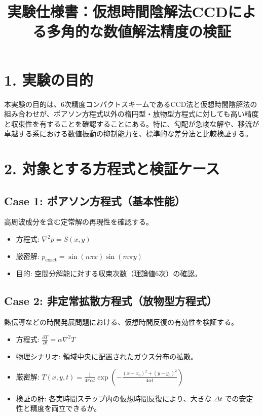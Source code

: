 \documentclass[12pt, a4paper, titlepage]{article}
\title{実験仕様書：仮想時間陰解法CCDによる多角的な数値解法精度の検証}
\author{}
\date{}
\begin{document}
\maketitle

\section*{1. 実験の目的}
本実験の目的は、6次精度コンパクトスキームであるCCD法と仮想時間陰解法の組み合わせが、ポアソン方程式以外の楕円型・放物型方程式に対しても高い精度と収束性を有することを確認することにある。特に、勾配が急峻な解や、移流が卓越する系における数値振動の抑制能力を、標準的な差分法と比較検証する。

\section*{2. 対象とする方程式と検証ケース}

\subsection*{Case 1: ポアソン方程式（基本性能）}
高周波成分を含む定常解の再現性を確認する。
\begin{itemize}
    \item 方程式: $\nabla^2 p = S(x, y)$
    \item 厳密解: $p_{\text{exact}} = \sin(n\pi x) \sin(m\pi y)$
    \item 目的: 空間分解能に対する収束次数（理論値6次）の確認。
\end{itemize}

\subsection*{Case 2: 非定常拡散方程式（放物型方程式）}
熱伝導などの時間発展問題における、仮想時間反復の有効性を検証する。
\begin{itemize}
    \item 方程式: $\frac{\partial T}{\partial t} = \alpha \nabla^2 T$
    \item 物理シナリオ: 領域中央に配置されたガウス分布の拡散。
    \item 厳密解: $T(x, y, t) = \frac{1}{4\pi \alpha t} \exp\left( -\frac{(x-x_0)^2 + (y-y_0)^2}{4\alpha t} \right)$
    \item 検証の肝: 各実時間ステップ内の仮想時間反復により、大きな $\Delta t$ での安定性と精度を両立できるか。
\end{itemize}
\end{document}
